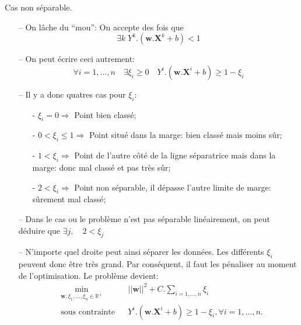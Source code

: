 \documentclass[9pt]{beamer}
\begin{document}
	\begin{frame}{Cas non séparable.}
		\begin{itemize}
			\item[--] On lâche du ``mou'': On accepte des fois que
			$$\exists k \; Y^k.(\textbf{w}.\textbf{X}^k + b) < 1$$
			\item[--] On peut écrire ceci autrement:
			$$\forall i=1,\dots,n \quad \exists \xi_i \geq 0 \quad Y^i.(\textbf{w}.\textbf{X}^i + b) \geq 1 - \xi_i$$

			\item[--] Il y a donc quatres cas pour $ \xi_i $:
			\begin{itemize}
				\item[-] $\xi_i = 0 \Rightarrow$ Point bien classé;
				\item[-] $0 < \xi_i \leq 1 \Rightarrow$ Point situé dans la marge: bien classé mais moins sûr;
				\item[-] $1 < \xi_i \Rightarrow$ Point de l'autre côté de la ligne séparatrice mais dans la marge: donc mal classé et pas très sûr;
				\item[-] $2 < \xi_i \Rightarrow$ Point non séparable, il dépasse l'autre limite de marge: sûrement mal classé;
			\end{itemize}

			\item[--] Dans le cas ou le problème n'est pas séparable linéairement, on peut déduire que
			$\exists j, \quad 2 < \xi_j$

			\item[--] N'importe quel droite peut ainsi séparer les données. Les différents $\xi_i$ peuvent donc être très grand. Par conséquent, il faut les pénaliser au moment de l'optimisation. Le problème devient:
			\begin{equation}
				\begin{aligned}
				& \min_{\textbf{w}, \xi_1,\dots,\xi_n \in \mathbb{R}^+}
				& & {\vert\vert \textbf{w} \vert\vert}^2 + C.\sum_{i=1,\dots,n}\xi_i\\
				& \text{sous contrainte}
				& & Y^i.(\textbf{w}.\textbf{X}^i + b) \geq 1 - \xi_i , \forall i = 1, \dots, n.
				\end{aligned}
			\end{equation}
		\end{itemize}
	\end{frame}
\end{document}
